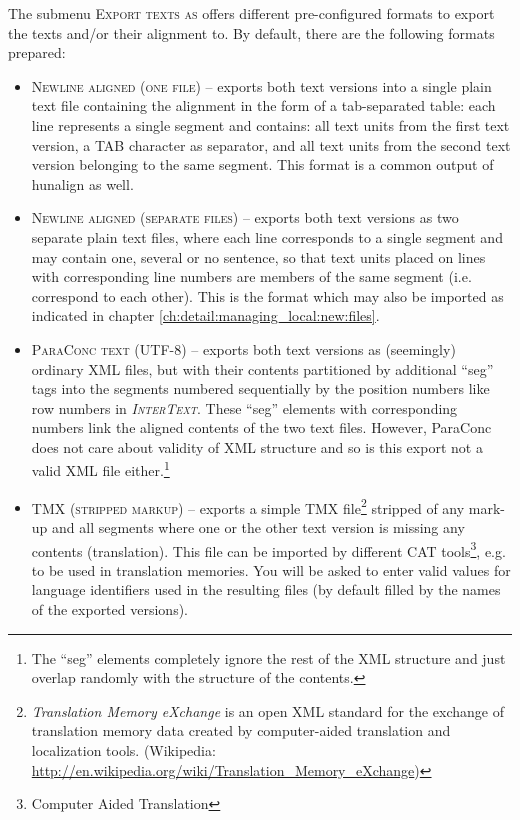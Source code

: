 \documentclass[a4paper,10pt,oneside]{book}
\newcommand{\IT}{\textit{\textsc{InterText}}\xspace}
\newcommand{\menu}[1]{\textsc{#1}}
\begin{document}
The submenu \menu{Export texts as} offers different pre-configured formats to export the texts and/or their alignment to. By default, there are the following formats prepared:

\begin{itemize}
 \item \menu{Newline aligned (one file)} -- exports both text versions into a single plain text file containing the alignment in the form of a tab-separated table: each line represents a single segment and contains: all text units from the first text version, a TAB character as separator, and all text units from the second text version belonging to the same segment. This format is a common output of hunalign as well.
 \item \menu{Newline aligned (separate files)} -- exports both text versions as two separate plain text files, where each line corresponds to a single segment and may contain one, several or no sentence, so that text units placed on lines with corresponding line numbers are members of the same segment (i.e. correspond to each other). This is the format which may also be imported as indicated in chapter \ref{ch:detail:managing_local:new:files}.
 \item \menu{ParaConc text (UTF-8)} -- exports both text versions as (seemingly) ordinary XML files, but with their contents partitioned by additional ``seg'' tags into the segments numbered sequentially by the position numbers like row numbers in \IT. These ``seg'' elements with corresponding numbers link the aligned contents of the two text files. However, ParaConc does not care about validity of XML structure and so is this export not a valid XML file either.\footnote{The ``seg'' elements completely ignore the rest of the XML structure and just overlap randomly with the structure of the contents.}
 \item \menu{TMX (stripped markup)} -- exports a simple TMX file\footnote{\emph{Translation Memory eXchange} is an open XML standard for the exchange of translation memory data created by computer-aided translation and localization tools. (Wikipedia: \url{http://en.wikipedia.org/wiki/Translation_Memory_eXchange})} stripped of any mark-up and all segments where one or the other text version is missing any contents (translation). This file can be imported by different CAT tools\footnote{Computer Aided Translation}, e.g. to be used in translation memories. You will be asked to enter valid values for language identifiers used in the resulting files (by default filled by the names of the exported versions).
\end{itemize}
\end{document}
